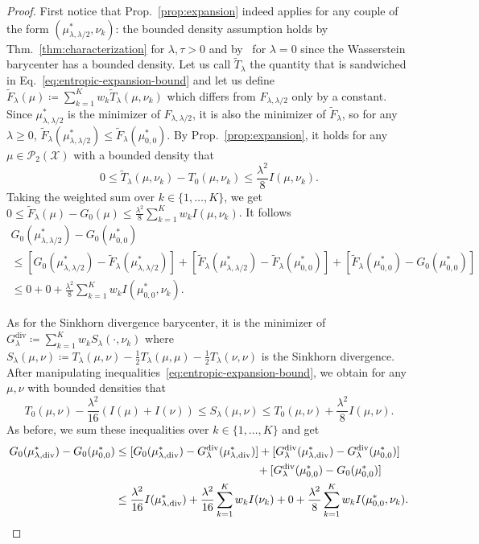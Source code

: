\documentclass[11pt]{article}
\newcommand{\rev}[1]{{#1}}
\newcommand{\Pp}{\mathcal{P}}
\newcommand{\Xx}{\mathcal{X}}
\begin{document}
\begin{proof}
First notice that Prop.~\ref{prop:expansion} indeed applies for any couple of the form $(\mu^*_{\lambda,\lambda/2},\nu_k)$: the bounded density assumption holds by Thm.~\ref{thm:characterization} for $\lambda,\tau>0$ and by~\cite[Thm.~5.1]{agueh2011barycenters} for $\lambda=0$ since the Wasserstein barycenter has a bounded density.
Let us call $\tilde T_\lambda$ the quantity that is sandwiched in Eq.~\eqref{eq:entropic-expansion-bound} and let us define $\tilde F_\lambda(\mu) \coloneqq \sum_{k=1}^K w_k\tilde T_\lambda(\mu,\nu_k)$ which differs from $F_{\lambda,\lambda/2}$ only by a constant. Since $\mu^*_{\lambda,\lambda/2}$ is the minimizer of $F_{\lambda,\lambda/2}$, it is also the minimizer of $\tilde F_\lambda$, so for any $\lambda\geq 0$, $\tilde F_\lambda(\mu^*_{\lambda,\lambda/2})\leq \tilde F_\lambda(\mu^*_{0,0})$.
%
By Prop.~\ref{prop:expansion}, it holds for any $\mu\in \Pp_2(\Xx)$ \rev{with a bounded density} that
 $$ 0\leq \tilde T_\lambda(\mu,\nu_k) - T_0(\mu,\nu_k) \leq \frac{\lambda^2}{8}I(\mu,\nu_k).$$ 
Taking the weighted sum over $k\in\{1,\dots, K\}$, we get $0\leq  \tilde F_\lambda(\mu)-G_0(\mu) \leq \frac{\lambda^2}{8}\sum_{k=1}^K w_k I(\mu,\nu_k)$. It follows
\begin{multline*}
G_0(\mu^*_{\lambda,\lambda/2}) - G_0(\mu^*_{0,0})\\
\leq [G_0(\mu^*_{\lambda,\lambda/2}) - \tilde F_\lambda(\mu^*_{\lambda,\lambda/2})]
 + [ \tilde F_\lambda(\mu^*_{\lambda,\lambda/2}) -  \tilde F_\lambda(\mu^*_{0,0})]
 +[\tilde F_\lambda(\mu^*_{0,0}) - G_0(\mu^*_{0,0})]\\
\leq 0 + 0 + \frac{\lambda^2}{8}\sum_{k=1}^K w_k I(\mu^*_{0,0},\nu_k).
\end{multline*}

As for the Sinkhorn divergence barycenter, it is the minimizer of $G^\mathrm{div}_\lambda  \coloneqq \sum_{k=1}^K w_kS_\lambda(\cdot,\nu_k)$ where
$
S_{\lambda}(\mu,\nu) \coloneqq T_\lambda(\mu,\nu) - \frac12 T_\lambda(\mu,\mu)-\frac12 T_\lambda(\nu,\nu)
$
is the Sinkhorn divergence. After manipulating inequalities~\eqref{eq:entropic-expansion-bound}, we obtain for any $\mu,\nu$ \rev{with bounded densities} that
$$
T_0(\mu,\nu) -\frac{\lambda^2}{16}(I(\mu)+I(\nu)) \leq S_{\lambda}(\mu,\nu) \leq T_0(\mu,\nu) +\frac{\lambda^2}{8}I(\mu,\nu).
$$
As before, we sum these inequalities over $k\in \{1,\dots,K\}$ and get
\begin{align*}
G_0(\mu^*_{\lambda,\mathrm{div}}) - G_0(\mu^*_{0,0})&\leq [G_0(\mu^*_{\lambda,\mathrm{div}}) - G^\mathrm{div}_{\lambda}(\mu^*_{\lambda,\mathrm{div}})]
 + [ G^\mathrm{div}_{\lambda}(\mu^*_{\lambda,\mathrm{div}}) -  G^\mathrm{div}_{\lambda}(\mu^*_{0,0})]\\
 &\qquad\qquad\qquad\qquad\qquad\qquad\;\;
 + [G^\mathrm{div}_{\lambda}(\mu^*_{0,0}) - G_0(\mu^*_{0,0})]\\
&\leq \frac{\lambda^2}{16}I(\mu^*_{\lambda,\mathrm{div}}) +\frac{\lambda^2}{16}\sum_{k=1}^K w_k I(\nu_k) + 0 + \frac{\lambda^2}{8}\sum_{k=1}^K w_k I(\mu^*_{0,0},\nu_k).\qedhere
\end{align*}
\end{proof}
\end{document}

